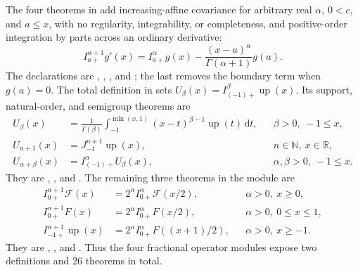 \documentclass[11pt,oneside]{article}
\theoremstyle{definition}
\theoremstyle{remark}
\newcommand{\Up}{\operatorname{up}}
\newcommand{\R}{\mathbb R}
\newcommand{\N}{\mathbb N}
\newcommand{\dd}{\,\mathrm d}
\newcommand{\1}{\mathbf 1}
\begin{document}
\begin{statusbox}
The four theorems in  add increasing-affine covariance
for arbitrary real \(\alpha\), \(0<c\), and \(a\le x\), with no regularity, integrability,
or completeness, and positive-order integration by parts across an ordinary derivative:
\begin{equation}
 I_{a+}^{\alpha+1}g'(x)
 =I_{a+}^{\alpha}g(x)-\frac{(x-a)^\alpha}{\Gamma(\alpha+1)}g(a).
 \label{p0:eq:fractional-volterra-add-one-deriv}
\end{equation}
The declarations are ,
,
, and
; the last removes the boundary
term when \(g(a)=0\).  The total definition
 in  sets
\(U_\beta(x)=I_{(-1)+}^{\beta}\Up(x)\).  Its support, natural-order, and semigroup theorems
are
\begin{align}
 U_\beta(x)
 &=\frac1{\Gamma(\beta)}
   \int_{-1}^{\min(x,1)}(x-t)^{\beta-1}\Up(t)\dd t,
 &&\beta>0,\ -1\le x,
 \label{p0:eq:rvachev-fractional-primitive-min}\\
 U_{n+1}(x)&=J_{-1}^{n+1}\Up(x),
 &&n\in\N,\ x\in\R,
 \label{p0:eq:rvachev-fractional-primitive-natural}\\
 U_{\alpha+\beta}(x)&=I_{(-1)+}^{\alpha}U_\beta(x),
 &&\alpha,\beta>0,\ -1\le x.
 \label{p0:eq:rvachev-fractional-primitive-semigroup}
\end{align}
They are ,
, and
.  The remaining three theorems in the module are
\begin{align}
 I_{0+}^{\alpha+1}\mathcal F(x)&=2^\alpha I_{0+}^{\alpha}\mathcal F(x/2),
 &&\alpha>0,\ x\ge0, \label{p0:eq:fractional-shift-global-Fabius}\\
 I_{0+}^{\alpha+1}F(x)&=2^\alpha I_{0+}^{\alpha}F(x/2),
 &&\alpha>0,\ 0\le x\le1, \label{p0:eq:fractional-shift-bounded-Fabius}\\
 I_{-1+}^{\alpha+1}\Up(x)&=2^\alpha I_{0+}^{\alpha}F((x+1)/2),
 &&\alpha>0,\ x\ge-1. \label{p0:eq:fractional-shift-Up}
\end{align}
They are ,
, and
.  Thus the four fractional operator
modules expose two definitions and 26 theorems in total.


\end{statusbox}
\end{document}
